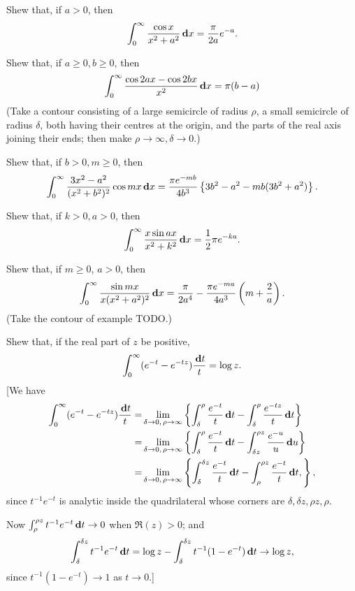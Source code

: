 \begin{wandwexample}
  Shew that, if $a > 0$, then
  $$
  \int_{0}^{\infty}
  \frac{ \cos x}{x^{2} + a^{2}} \, \mathbf{d} x
  =
  \frac{\pi}{2a} e^{-a}.
  $$
\end{wandwexample}
\begin{wandwexample}
  Shew that, if $a \geq 0, b \geq 0$, then
  $$
  \int_{0}^{\infty}
  \frac{ \cos 2ax - \cos 2bx}{x^{2}}
  \, \mathbf{d} x
  =
  \pi (b-a)
  $$
  (Take a contour consisting of a large semicircle of radius $\rho$, a
  small semicircle of radius $\delta$, both having their centres at the
  origin, and the parts of the real axis joining their ends; then
  make $\rho \rightarrow \infty, \delta \rightarrow 0$.)
\end{wandwexample}
\begin{wandwexample}
  Shew that, if $b > 0, m \geq 0$, then
  $$
  \int_{0}^{\infty}
  \frac{3x^{2} - a^{2}}{ (x^{2} + b^{2})^{2} }
  \cos mx
  \, \mathbf{d} x
  =
  \frac{\pi e^{-mb}}{4b^{3}}
  \left\{ 
    3b^{2} - a^{2} - mb(3b^{2}+a^{2})
   \right\}.
  $$
\end{wandwexample}
\begin{wandwexample}
  Shew that, if $k > 0, a > 0$, then
  $$
  \int_{0}^{\infty}
  \frac{ x \sin ax }{x^{2} + k^{2}}
  \, \mathbf{d} x
  =
  \frac{1}{2} \pi e^{-ka}.
  $$
\end{wandwexample}
\begin{wandwexample}
  Shew that, if $m \geq 0$, $a > 0$, then
  $$
  \int_{0}^{\infty}
  \frac{ \sin mx }{ x (x^{2} + a^{2})^{2} }
  \, \mathbf{d} x
  =
  \frac{\pi}{2a^{4}}
  -
  \frac{\pi e^{-ma}}{4a^{3}}
  \left(  m + \frac{2}{a}  \right).
  $$
  (Take the contour of example TODO.)
\end{wandwexample}
\begin{wandwexample}
Shew that, if the real part of $z$ be positive,
$$
\int_{0}^{\infty} (e^{-t} - e^{-tz}) \frac{\, \mathbf{d} t}{t} = \log z.
$$
[We have
\begin{align*}
  \int_{0}^{\infty} (e^{-t} - e^{-tz}) \frac{\, \mathbf{d} t}{t}
  =&
  \lim_{\delta\rightarrow 0,\, \rho\rightarrow\infty}
  \left\{ 
    \int_{\delta}^{\rho} \frac{e^{-t}}{t} \, \mathbf{d} t
    -
    \int_{\delta}^{\rho} \frac{e^{-tz}}{t} \, \mathbf{d} t
   \right\}
  \\
  =&
  \lim_{\delta\rightarrow 0,\, \rho\rightarrow\infty}  
    \left\{ 
    \int_{\delta}^{\rho} \frac{e^{-t}}{t} \, \mathbf{d} t
    -
    \int_{\delta z}^{\rho z} \frac{e^{-u}}{u} \, \mathbf{d} u
   \right\}
  \\
  =&
  \lim_{\delta\rightarrow 0,\, \rho\rightarrow\infty}  
    \left\{ 
    \int_{\delta}^{\delta z} \frac{e^{-t}}{t} \, \mathbf{d} t
    -
    \int_{\rho}^{\rho z} \frac{e^{-t}}{t} \, \mathbf{d} t,
   \right\},
\end{align*}
since $t^{-1} e^{-t}$ is analytic inside the
quadrilateral whose corners are $\delta, \delta z, \rho z, \rho$.

%
%

Now $\int_{\rho}^{\rho z} t^{-1} e^{-t} \, \mathbf{d} t \rightarrow 0$
when $\Re(z) > 0$; and
$$
\int_{\delta}^{\delta z} t^{-1} e^{-t} \, \mathbf{d} t
= \log z
-
\int_{\delta}^{\delta z} t^{-1} (1 - e^{-t}) \, \mathbf{d} t
\rightarrow
\log z,
$$
since $t^{-1} (1 - e^{-t}) \rightarrow 1$ as $t \rightarrow 0$.]
\end{wandwexample}
